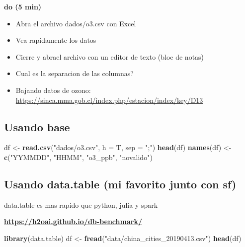 \documentclass[]{book}
\newenvironment{Shaded}{\begin{snugshade}}{\end{snugshade}}
\newcommand{\DataTypeTok}[1]{\textcolor[rgb]{0.13,0.29,0.53}{#1}}
\newcommand{\KeywordTok}[1]{\textcolor[rgb]{0.13,0.29,0.53}{\textbf{#1}}}
\newcommand{\NormalTok}[1]{#1}
\newcommand{\StringTok}[1]{\textcolor[rgb]{0.31,0.60,0.02}{#1}}
\providecommand{\tightlist}{%
  \setlength{\itemsep}{0pt}\setlength{\parskip}{0pt}}
\begin{document}
\textbf{do (5 min)}

\begin{itemize}
\tightlist
\item
  Abra el archivo dados/o3.csv con Excel
\item
  Vea rapidamente los datos
\item
  Cierre y abrael archivo con un editor de texto (bloc de notas)
\item
  Cual es la separacion de las columnas?
\item
  Bajando datos de ozono: \url{https://sinca.mma.gob.cl/index.php/estacion/index/key/D13}
\end{itemize}

\hypertarget{usando-base}{%
\subsection{Usando base}\label{usando-base}}

\begin{Shaded}
\begin{Highlighting}[]
\NormalTok{df <-}\StringTok{ }\KeywordTok{read.csv}\NormalTok{(}\StringTok{"dados/o3.csv"}\NormalTok{, }\DataTypeTok{h =}\NormalTok{ T, }\DataTypeTok{sep =} \StringTok{";"}\NormalTok{)}
\KeywordTok{head}\NormalTok{(df)}
\KeywordTok{names}\NormalTok{(df) <-}\StringTok{ }\KeywordTok{c}\NormalTok{(}\StringTok{"YYMMDD"}\NormalTok{, }\StringTok{"HHMM"}\NormalTok{, }\StringTok{"o3_ppb"}\NormalTok{, }\StringTok{"novalido"}\NormalTok{)}
\end{Highlighting}
\end{Shaded}

\hypertarget{usando-data.table-mi-favorito-junto-con-sf}{%
\subsection{Usando data.table (mi favorito junto con sf)}\label{usando-data.table-mi-favorito-junto-con-sf}}

data.table es mas rapido que python, julia y spark

\textbf{\url{https://h2oai.github.io/db-benchmark/}}

\begin{Shaded}
\begin{Highlighting}[]
\KeywordTok{library}\NormalTok{(data.table)}
\NormalTok{df <-}\StringTok{ }\KeywordTok{fread}\NormalTok{(}\StringTok{"data/china_cities_20190413.csv"}\NormalTok{)}
\KeywordTok{head}\NormalTok{(df)}
\end{Highlighting}
\end{Shaded}
\end{document}
